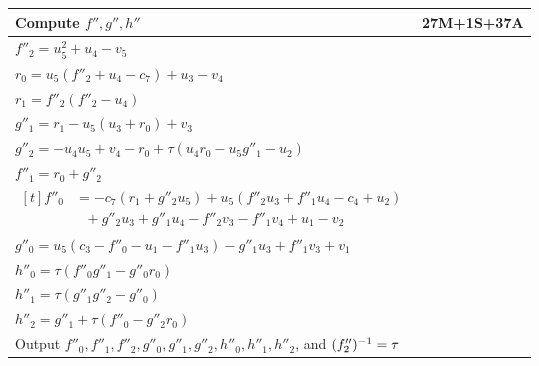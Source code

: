 \begin{longtable}{|l|r|}
  \hline  \hline
    Compute $f'', g'', h''$ & 27M+1S+37A \\
  \hline
    $f''_2 = u_5^2 + u_4 - v_5$ & \\
    $r_0   = u_5(f''_2 + u_4 - c_7) + u_3 - v_4$ & \\
    $r_1   = f''_2(f''_2 - u_4)$ & \\
    $g''_1 = r_1 - u_5(u_3 + r_0) + v_3$ & \\
    $g''_2 = -u_4u_5 + v_4 - r_0 + \tau(u_4r_0 - u_5g''_1 - u_2)$ & \\
    $f''_1 = r_0 + g''_2$ & \\
    $\begin{aligned}[t]
    f''_0 &= -c_7(r_1 + g''_2u_5) + u_5(f''_2u_3 + f''_1u_4 - c_4 + u_2) \\
          &~~~ + g''_2u_3 + g''_1u_4 - f''_2v_3 - f''_1v_4 + u_1 - v_2
    \end{aligned}$ & \\
    $g''_0 = u_5(c_3 - f''_0 - u_1 - f''_1u_3) - g''_1u_3 + f''_1v_3 + v_1$ & \\
    $h''_0 = \tau(f''_0g''_1 - g''_0r_0)$ & \\
    $h''_1 = \tau(g''_1g''_2 - g''_0)$ & \\
    $h''_2 = g''_1 + \tau(f''_0 - g''_2r_0)$ & \\
  \hline  \hline
    Output $f''_0, f''_1, f''_2, g''_0, g''_1, g''_2, h''_0, h''_1, h''_2$, and $(f''_2)^{-1} = \tau$ & \\
  \hline
\end{longtable}

